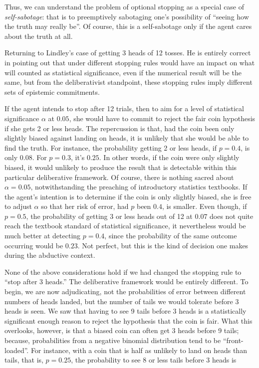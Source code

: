 Thus, we can understand the problem of optional stopping as a special
case of \emph{self-sabotage}: that is to preemptively sabotaging one's
possibility of ``seeing how the truth may really be''. Of course, this
is a self-sabotage only if the agent cares about the truth at all.

Returning to Lindley's case of getting 3 heads of 12 tosses. He is
entirely correct in pointing out that under different stopping rules
would have an impact on what will counted as statistical significance,
even if the numerical result will be the same, but from the
deliberativist standpoint, these stopping rules imply different sets of
epistemic commitments.

If the agent intends to stop after 12 trials, then to aim for a level of
statistical significance \(\alpha\) at \(0.05\), she would have to
commit to reject the fair coin hypothesis if she gets 2 or less heads.
The repercussion is that, had the coin been only slightly biased against
landing on heads, it is unlikely that she would be able to find the
truth. For instance, the probability getting 2 or less heads, if
\(p=0.4\), is only \(0.08\). For \(p=0.3\), it's \(0.25\). In other
words, if the coin were only slightly biased, it would unlikely to
produce the result that is detectable within this particular
deliberative framework. Of course, there is nothing sacred about
\(\alpha= 0.05\), notwithstanding the preaching of introductory
statistics textbooks. If the agent's intention is to determine if the
coin is only slightly biased, she is free to adjust \(\alpha\) so that
her risk of error, had \(p\) been \(0.4\), is smaller. Even though, if
\(p=0.5\), the probability of getting 3 or less heads out of 12 at
\(0.07\) does not quite reach the textbook standard of statistical
significance, it nevertheless would be much better at detecting
\(p=0.4\), since the probability of the same outcome occurring would be
\(0.23\). Not perfect, but this is the kind of decision one makes during
the abductive context.

None of the above considerations hold if we had changed the stopping
rule to ``stop after 3 heads.'' The deliberative framework would be
entirely different. To begin, we are now adjudicating, not the
probabilities of error between different numbers of heads landed, but
the number of tails we would tolerate before 3 heads is seen. We saw
that having to see 9 tails before 3 heads is a statistically significant
enough reason to reject the hypothesis that the coin is fair. What this
overlooks, however, is that a biased coin can often get 3 heads before 9
tails; because, probabilities from a negative binomial distribution tend
to be ``front-loaded''. For instance, with a coin that is half as
unlikely to land on heads than tails, that is, \(p=0.25\), the
probability to see 8 or less tails before 3 heads is

